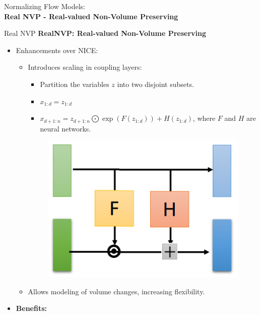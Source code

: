 \begin{frame}[allowframebreaks]{}
    \LARGE Normalizing Flow Models: \\[1.5ex] \textbf{\Large Real NVP - Real-valued Non-Volume Preserving}
\end{frame}

\begin{frame}[allowframebreaks]{Real NVP}
\textbf{RealNVP: Real-valued Non-Volume Preserving}
\begin{itemize}
    \item Enhancements over NICE:
    \begin{itemize}
        \item Introduces scaling in coupling layers:
        \begin{itemize}
            \item Partition the variables $z$ into two disjoint subsets.
            \item $x_{1:d} = z_{1:d}$
            \item $x_{d+1:n} = z_{d+1:n} \bigodot \exp\left(F(z_{1:d})\right) + H(z_{1:d})$, where $F$ and $H$ are neural networks.
        \end{itemize}
        \begin{figure}
            \centering
            \includegraphics[height=0.4\textheight, width=\textwidth, keepaspectratio]{images/norm-flow/nfm_realnvp.png}
        \end{figure}
        \item Allows modeling of volume changes, increasing flexibility.
    \end{itemize}
    \framebreak
    \item \textbf{Benefits:}

\end{itemize}
\end{frame}
